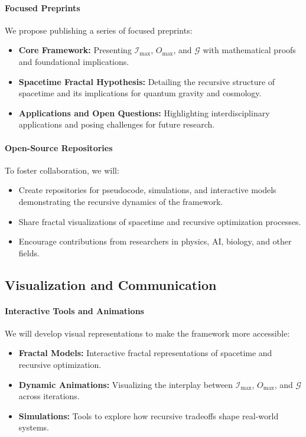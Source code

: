 \documentclass[12pt]{article}
\begin{document}
\paragraph{Focused Preprints}
We propose publishing a series of focused preprints:
\begin{itemize}
    \item \textbf{Core Framework:} Presenting \(\mathcal{I}_{\text{max}}\), \(O_{\text{max}}\), and \(\mathcal{G}\) with mathematical proofs and foundational implications.
    \item \textbf{Spacetime Fractal Hypothesis:} Detailing the recursive structure of spacetime and its implications for quantum gravity and cosmology.
    \item \textbf{Applications and Open Questions:} Highlighting interdisciplinary applications and posing challenges for future research.
\end{itemize}

\paragraph{Open-Source Repositories}
To foster collaboration, we will:
\begin{itemize}
    \item Create repositories for pseudocode, simulations, and interactive models demonstrating the recursive dynamics of the framework.
    \item Share fractal visualizations of spacetime and recursive optimization processes.
    \item Encourage contributions from researchers in physics, AI, biology, and other fields.
\end{itemize}

\subsection{Visualization and Communication}

\paragraph{Interactive Tools and Animations}
We will develop visual representations to make the framework more accessible:
\begin{itemize}
    \item \textbf{Fractal Models:} Interactive fractal representations of spacetime and recursive optimization.
    \item \textbf{Dynamic Animations:} Visualizing the interplay between \(\mathcal{I}_{\text{max}}\), \(O_{\text{max}}\), and \(\mathcal{G}\) across iterations.
    \item \textbf{Simulations:} Tools to explore how recursive tradeoffs shape real-world systems.
\end{itemize}
\end{document}
